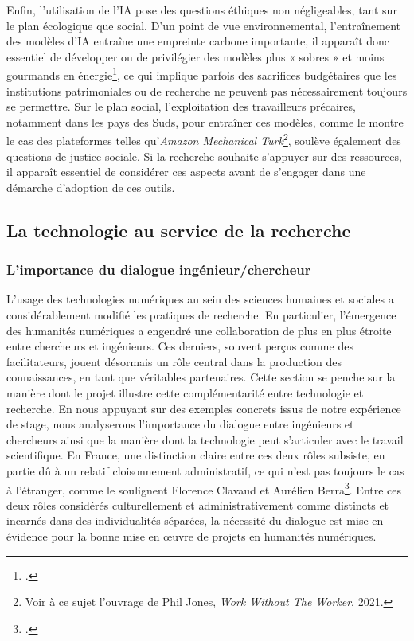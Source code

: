 Enfin, l’utilisation de l’IA pose des questions éthiques non négligeables, tant sur le plan écologique que social. D’un point de vue environnemental, l'entraînement des modèles d’IA entraîne une empreinte carbone importante, il apparaît donc essentiel de développer ou de privilégier des modèles plus « sobres » et moins gourmands en énergie\footcite[p.3]{chague_lintelligence_2022}, ce qui implique parfois des sacrifices budgétaires que les institutions patrimoniales ou de recherche ne peuvent pas nécessairement toujours se permettre. Sur le plan social, l’exploitation des travailleurs précaires, notamment dans les pays des Suds, pour entraîner ces modèles, comme le montre le cas des plateformes telles qu’\textit{Amazon Mechanical Turk}\footnote{Voir à ce sujet l’ouvrage de Phil Jones, \textit{Work Without The Worker}, 2021.}, soulève également des questions de justice sociale. Si la recherche souhaite s’appuyer sur des ressources, il apparaît essentiel de considérer ces aspects avant de s’engager dans une démarche d’adoption de ces outils.

\subsection{La technologie au service de la recherche}

\subsubsection{L’importance du dialogue ingénieur/chercheur}

L’usage des technologies numériques au sein des sciences humaines et sociales a considérablement modifié les pratiques de recherche. En particulier, l’émergence des humanités numériques a engendré une collaboration de plus en plus étroite entre chercheurs et ingénieurs. Ces derniers, souvent perçus comme des facilitateurs, jouent désormais un rôle central dans la production des connaissances, en tant que véritables partenaires. Cette section se penche sur la manière dont le projet \pense illustre cette complémentarité entre technologie et recherche. En nous appuyant sur des exemples concrets issus de notre expérience de stage, nous analyserons l’importance du dialogue entre ingénieurs et chercheurs ainsi que la manière dont la technologie peut s’articuler avec le travail scientifique.
En France, une distinction claire entre ces deux rôles subsiste, en partie dû à un relatif cloisonnement administratif, ce qui n’est pas toujours le cas à l’étranger, comme le soulignent Florence Clavaud et Aurélien Berra\footcite{collectif_formations_2012}. Entre ces deux rôles considérés culturellement et administrativement comme distincts et incarnés dans des individualités séparées, la nécessité du dialogue est mise en évidence pour la bonne mise en œuvre de projets en humanités numériques.

